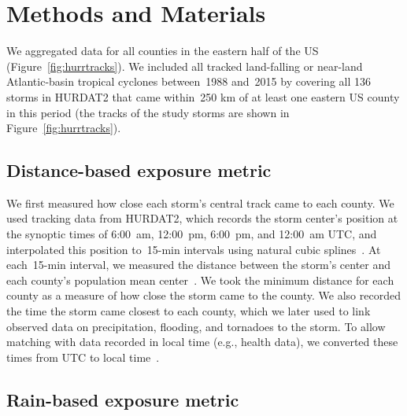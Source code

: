\section*{Methods and Materials}

We aggregated data for all counties in the eastern half of the \ac{US}
(Figure~\ref{fig:hurrtracks}). We
included all tracked land-falling or near-land Atlantic-basin tropical cyclones
between~1988 and~2015 by covering all 136 storms in \ac{HURDAT2}
\parencite{landsea2013} that came within~250 \si{\kilo\metre} of at least one
eastern \ac{US} county in this period (the tracks of the study storms are shown in 
Figure~\ref{fig:hurrtracks}). 

\subsection*{Distance-based exposure metric}

We first measured how close each storm's central track came to each county. We
used tracking data from \ac{HURDAT2}, which records the storm center's position
at the synoptic times of 6:00~am, 12:00~pm, 6:00~pm, and 12:00~am \ac{UTC}, and
interpolated this position to~15-\si{\minute} intervals using natural cubic
splines~\parencite{hurricaneexposure}. At each~15-\si{\minute} interval, we
measured the distance between the storm's center and each county's population
mean center~\parencite{bivand2013applied, countycenters}. We took the minimum
distance for each county as a measure of how close the storm came to the
county.  We also recorded the time the storm came closest to each county, which
we later used to link observed data on precipitation, flooding, and tornadoes
to the storm.  To allow matching with data recorded in local time (e.g., health
data), we converted these times from \ac{UTC} to local
time~\parencite{countytimezones}.

\subsection*{Rain-based exposure metric}

